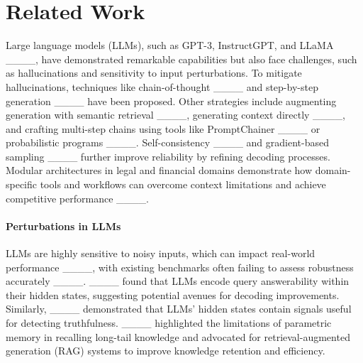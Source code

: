 \section{Related Work}
Large language models (LLMs), such as GPT-3, InstructGPT, and LLaMA ____, have demonstrated remarkable capabilities but also face challenges, such as hallucinations and sensitivity to input perturbations. To mitigate hallucinations, techniques like chain-of-thought ____ and step-by-step generation ____ have been proposed. Other strategies include augmenting generation with semantic retrieval ____, generating context directly ____, and crafting multi-step chains using tools like PromptChainer ____ or probabilistic programs ____. Self-consistency ____ and gradient-based sampling ____ further improve reliability by refining decoding processes. Modular architectures in legal and financial domains demonstrate how domain-specific tools and workflows can overcome context limitations and achieve competitive performance ____.

\paragraph{Perturbations in LLMs}
LLMs are highly sensitive to noisy inputs, which can impact real-world performance ____, with existing benchmarks often failing to assess robustness accurately ____. ____ found that LLMs encode query answerability within their hidden states, suggesting potential avenues for decoding improvements. Similarly, ____ demonstrated that LLMs' hidden states contain signals useful for detecting truthfulness. ____ highlighted the limitations of parametric memory in recalling long-tail knowledge and advocated for retrieval-augmented generation (RAG) systems to improve knowledge retention and efficiency.


